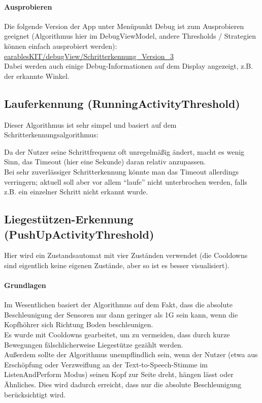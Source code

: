 \documentclass[a4paper,12pt]{article}
\begin{document}
\paragraph{Ausprobieren}
Die folgende Version der App unter Menüpunkt Debug ist zum Ausprobieren geeignet (Algorithmus hier im DebugViewModel, andere Thresholds / Strategien können einfach ausprobiert werden): 
\href{https://github.com/vlle1/earablesKIT/tree/b8b34bbe0716ddb37c5afbd315e91d7f11c0270d}{earablesKIT/debugView/Schritterkennung\_Version\_3}\\
Dabei werden auch einige Debug-Informationen auf dem Display angezeigt, z.B. der erkannte Winkel.

\subsection{Lauferkennung (RunningActivityThreshold)}
Dieser Algorithmus ist sehr simpel und basiert auf dem Schritterkennungsalgorithmus: 
\newline

Da der Nutzer seine Schrittfrequenz oft unregelmäßig ändert, macht es wenig Sinn, das Timeout (hier eine Sekunde) daran relativ anzupassen.\\
Bei sehr zuverlässiger Schritterkennung könnte man das Timeout allerdings verringern; aktuell soll aber vor allem ``laufe'' nicht unterbrochen werden, falls z.B. ein einzelner Schritt nicht erkannt wurde.\\ 

\subsection{Liegestützen-Erkennung (PushUpActivityThreshold)}
Hier wird ein Zustandsautomat mit vier Zuständen verwendet (die Cooldowns sind eigentlich keine eigenen Zustände, aber so ist es besser visualisiert). 
\paragraph{Grundlagen}
Im Wesentlichen basiert der Algorithmus auf dem Fakt, dass die absolute Beschleunigung der Sensoren nur dann geringer als 1G sein kann, wenn die Kopfhöhrer sich Richtung Boden beschleunigen.\\
Es wurde mit Cooldowns gearbeitet, um zu vermeiden, dass durch kurze Bewegungen fälschlicherweise Liegestütze gezählt werden.\\
Außerdem sollte der Algorithmus unempflindlich sein, wenn der Nutzer (etwa aus Erschöpfung oder Verzweiflung an der Text-to-Speech-Stimme im ListenAndPerform Modus) seinen Kopf zur Seite dreht, hängen lässt oder Ähnliches. Dies wird dadurch erreicht, dass nur die absolute Beschleunigung berücksichtigt wird.
\end{document}
